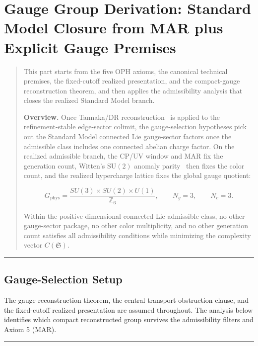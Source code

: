 \section{Gauge Group Derivation: Standard Model Closure from MAR plus Explicit Gauge Premises}\label{gauge-group-derivation-standard-model-closure-under-extended-mar}

\begin{quote}
This part starts from the five OPH axioms, the canonical technical premises, the fixed-cutoff realized presentation, and the compact-gauge reconstruction theorem, and then applies the admissibility analysis that closes the realized Standard Model branch.

\textbf{Overview.} Once Tannaka/DR reconstruction~\cite{tannaka38,krein49,dr89,dr90} is applied to the refinement-stable edge-sector colimit, the gauge-selection hypotheses pick out the Standard Model connected Lie gauge-sector factors once the admissible class includes one connected abelian charge factor. On the realized admissible branch, the CP/UV window and MAR fix the generation count, Witten's \(\mathrm{SU}(2)\) anomaly parity~\cite{witten82} then fixes the color count, and the realized hypercharge lattice fixes the global gauge quotient:

\[G_{\mathrm{phys}} = \frac{SU(3) \times SU(2) \times U(1)}{\mathbb{Z}_6}, \qquad N_g = 3, \qquad N_c = 3.\]

Within the positive-dimensional connected Lie admissible class, no other gauge-sector package, no other color multiplicity, and no other generation count satisfies all admissibility conditions while minimizing the complexity vector \(C(\mathfrak S)\).
\end{quote}

\begin{center}\rule{0.5\linewidth}{0.5pt}\end{center}

\subsection{Gauge-Selection Setup}\label{1-premise-summary}

The gauge-reconstruction theorem, the central transport-obstruction clause, and the fixed-cutoff realized presentation are assumed throughout. The analysis below identifies which compact reconstructed group survives the admissibility filters and Axiom 5 (MAR).

\begin{center}\rule{0.5\linewidth}{0.5pt}\end{center}

